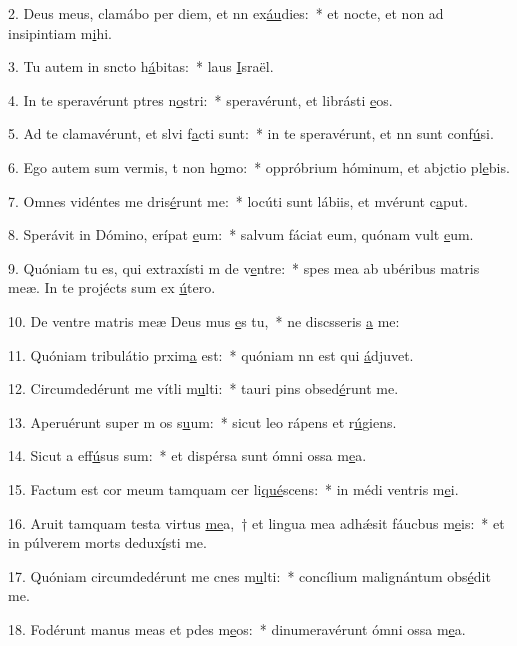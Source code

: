 2. Deus meus, clamábo per diem, et nn ex\uline{áu}dies:~* et nocte, et non ad insipintiam m\uline{i}hi.\par 
3. Tu autem in sncto h\uline{á}bitas:~* laus \uline{I}sraël.\par 
4. In te speravérunt ptres n\uline{o}stri:~* speravérunt, et librásti \uline{e}os.\par 
5. Ad te clamavérunt, et slvi f\uline{a}cti sunt:~* in te speravérunt, et nn sunt conf\uline{ú}si.\par 
6. Ego autem sum vermis, t non h\uline{o}mo:~* oppróbrium hóminum, et abjctio pl\uline{e}bis.\par 
7. Omnes vidéntes me dris\uline{é}runt me:~* locúti sunt lábiis, et mvérunt c\uline{a}put.\par 
8. Sperávit in Dómino, erípat \uline{e}um:~* salvum fáciat eum, quónam vult \uline{e}um.\par 
9. Quóniam tu es, qui extraxísti m de v\uline{e}ntre:~* spes mea ab ubéribus matris meæ. In te projécts sum ex \uline{ú}tero.\par 
10. De ventre matris meæ Deus mus \uline{e}s tu,~* ne discsseris \uline{a} me:\par 
11. Quóniam tribulátio prxim\uline{a} est:~* quóniam nn est qui \uline{á}djuvet.\par 
12. Circumdedérunt me vítli m\uline{u}lti:~* tauri pins obsed\uline{é}runt me.\par 
13. Aperuérunt super m os s\uline{u}um:~* sicut leo rápens et r\uline{ú}giens.\par 
14. Sicut a eff\uline{ú}sus sum:~* et dispérsa sunt ómni ossa m\uline{e}a.\par 
15. Factum est cor meum tamquam cer li\uline{qué}scens:~* in médi ventris m\uline{e}i.\par 
16. Aruit tamquam testa virtus \uline{me}a,~† et lingua mea adhǽsit fáucbus m\uline{e}is:~* et in púlverem morts dedux\uline{í}sti me.\par 
17. Quóniam circumdedérunt me cnes m\uline{u}lti:~* concílium malignántum obs\uline{é}dit me.\par 
18. Fodérunt manus meas et pdes m\uline{e}os:~* dinumeravérunt ómni ossa m\uline{e}a.\par 
